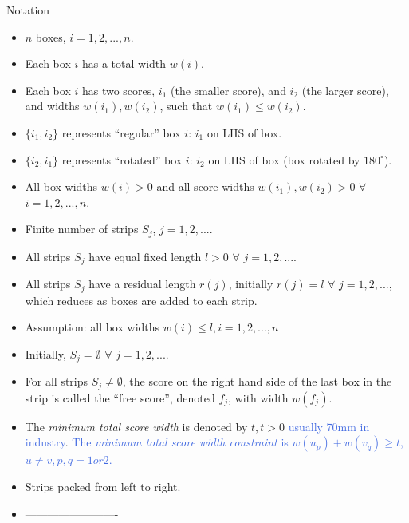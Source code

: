 \documentclass{llncs}
\begin{document}
Notation
\begin{itemize}
	\item $n$ boxes, $i = 1, 2, ..., n$.
	\item Each box $i$ has a total width $w(i)$.
	\item Each box $i$ has two scores, $i_1$ (the smaller score), and $i_2$ (the larger score), and widths $w(i_1), w(i_2)$, such that $w(i_1) \leq w(i_2)$.
	\item $\{i_1, i_2\}$ represents ``regular'' box $i$: $i_1$ on LHS of box.
	\item $\{i_2, i_1\}$ represents ``rotated'' box $i$: $i_2$ on LHS of box (box rotated by $180^{\circ}$).
	\item All box widths $w(i) > 0$ and all score widths $w(i_1), w(i_2) > 0$ $\forall$ $i = 1, 2, ..., n$.
	\item Finite number of strips $S_j$, $j = 1, 2, ...$.
	\item All strips $S_j$ have equal fixed length $l > 0$ $\forall$ $j = 1, 2, ...$.
	\item All strips $S_j$ have a residual length $r(j)$, initially $r(j) = l$ $\forall$ $j = 1,2, ...$, which reduces as boxes are added to each strip.
	\item Assumption: all box widths $w(i) \leq l, i = 1, 2, ..., n$
	\item Initially, $S_j = \emptyset$ $\forall$ $j = 1, 2, ...$.
	\item For all strips $S_j \neq \emptyset$, the score on the right hand side of the last box in the strip is called the ``free score'', denoted $f_j$, with width $w(f_j)$.
	\item The \textit{minimum total score width} is denoted by $t, t > 0$ \textcolor{RoyalBlue}{usually 70mm in industry}. \textcolor{RoyalBlue}{The \textit{minimum total score width constraint} is $w(u_p) + w(v_q) \geq t$, $u \neq v, p, q = 1 or 2$.}
	\item Strips packed from left to right.
	
	\item -------------------------
	

\end{itemize}
\end{document}
